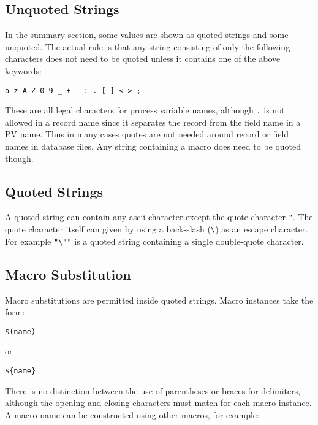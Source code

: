 \subsection{Unquoted Strings}

In the summary section, some values are shown as quoted strings and some unquoted.
The actual rule is that any string consisting of only the following characters does not need to be quoted unless it contains one of the above keywords:

\begin{verbatim}
a-z A-Z 0-9 _ + - : . [ ] < > ;
\end{verbatim}

These are all legal characters for process variable names, although \verb|.| is not allowed in a record name since it separates the record from the field name in a PV name.
Thus in many cases quotes are not needed around record or field names in database files.
Any string containing a macro does need to be quoted though.

\subsection{Quoted Strings}

A quoted string can contain any ascii character except the quote character \verb|"|.
The quote character itself can given by using a back-slash (\verb|\|) as an escape character.
For example \verb|"\""| is a quoted string containing a single double-quote character.

\subsection{Macro Substitution}

Macro substitutions are permitted inside quoted strings.
Macro instances take the form:

\begin{verbatim}
$(name)
\end{verbatim}

or

\begin{verbatim}
${name}
\end{verbatim}

There is no distinction between the use of parentheses or braces for delimiters, although the opening and closing characters must match for each macro instance.
A macro name can be constructed using other macros, for example:

